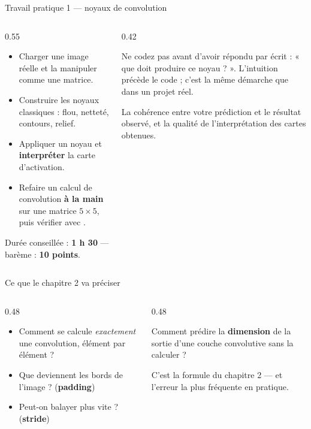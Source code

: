 \begin{frame}{Travail pratique 1 --- noyaux de convolution}
\begin{columns}[t]
\begin{column}{0.55\textwidth}
\begin{abox}
\begin{itemize}
  \item Charger une image réelle et la manipuler comme une matrice.
  \item Construire les noyaux classiques : flou, netteté, contours, relief.
  \item Appliquer un noyau et \textbf{interpréter} la carte d'activation.
  \item Refaire un calcul de convolution \textbf{à la main} sur une matrice
  $5 \times 5$, puis vérifier avec .
\end{itemize}
\medskip
Durée conseillée : \textbf{1 h 30} --- barème : \textbf{10 points}.
\end{abox}
\end{column}
\begin{column}{0.42\textwidth}
\begin{wbox}
Ne codez pas avant d'avoir répondu par écrit : « que doit produire ce noyau ? ».
L'intuition précède le code ; c'est la même démarche que dans un projet réel.
\end{wbox}
\begin{solbox}
La cohérence entre votre prédiction et le résultat observé, et la qualité de
l'interprétation des cartes obtenues.
\end{solbox}
\end{column}
\end{columns}
\end{frame}

\begin{frame}{Ce que le chapitre 2 va préciser}
\begin{columns}[t]
\begin{column}{0.48\textwidth}
\begin{kbox}
\begin{itemize}
  \item Comment se calcule \emph{exactement} une convolution, élément par élément ?
  \item Que deviennent les bords de l'image ? (\textbf{padding})
  \item Peut-on balayer plus vite ? (\textbf{stride})
\end{itemize}
\end{kbox}
\end{column}
\begin{column}{0.48\textwidth}
\begin{kbox}
Comment prédire la \textbf{dimension} de la sortie d'une couche convolutive
sans la calculer ?

\medskip
C'est la formule du chapitre 2 --- et l'erreur la plus fréquente en
pratique.
\end{kbox}
\end{column}
\end{columns}
\end{frame}
